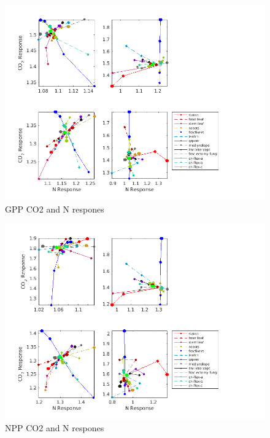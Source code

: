 \documentclass[draft,linenumbers]{agujournal}
\begin{document}
 \begin{figure}[h]
     \centering
     \includegraphics[width=1.55\textwidth, left]{matlab/figures/OCT_CNdep_GPP1_CLM50defpft_ndep_1x1pt_US-Me2_ens_MIC_p2006.png}
     \caption{GPP CO2 and N respones}
     \label{GPP CO2 and N respones 2006}
  \end{figure}
      
 \begin{figure}[h]
     \includegraphics[width=1.55\textwidth, left]{matlab/figures/OCT_CNdep_NPP1_CLM50defpft_ndep_1x1pt_US-Me2_ens_MIC_p2006.png}
     \caption{NPP CO2 and N respones}
     \label{NPP CO2 and N respones}
  \end{figure}
    
\end{document}
